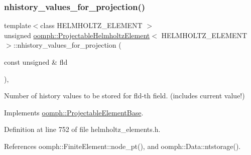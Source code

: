 \mbox{\label{classoomph_1_1ProjectableHelmholtzElement_aae069d7dba3ab7ae1677053e5c55ba93}} 
\subsubsection{\texorpdfstring{nhistory\+\_\+values\+\_\+for\+\_\+projection()}{nhistory\_values\_for\_projection()}}
{\footnotesize\ttfamily template$<$class H\+E\+L\+M\+H\+O\+L\+T\+Z\+\_\+\+E\+L\+E\+M\+E\+NT $>$ \\
unsigned \hyperlink{classoomph_1_1ProjectableHelmholtzElement}{oomph\+::\+Projectable\+Helmholtz\+Element}$<$ H\+E\+L\+M\+H\+O\+L\+T\+Z\+\_\+\+E\+L\+E\+M\+E\+NT $>$\+::nhistory\+\_\+values\+\_\+for\+\_\+projection (\begin{DoxyParamCaption}\item[{const unsigned \&}]{fld }\end{DoxyParamCaption})\hspace{0.3cm}{\ttfamily [inline]}, {\ttfamily [virtual]}}



Number of history values to be stored for fld-\/th field. (includes current value!) 



Implements \hyperlink{classoomph_1_1ProjectableElementBase_ac6790f394630b964663281f8740f43a5}{oomph\+::\+Projectable\+Element\+Base}.



Definition at line 752 of file helmholtz\+\_\+elements.\+h.



References oomph\+::\+Finite\+Element\+::node\+\_\+pt(), and oomph\+::\+Data\+::ntstorage().

\mbox{\label{classoomph_1_1ProjectableHelmholtzElement_abcab89ec5baac0407527579afc8aac15}} 
